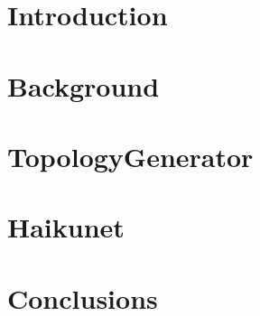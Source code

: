 \documentclass[11pt,a4paper,twoside]{tesis}
\begin{document}
\def\titulo{Licenciado }

\def\autor{Andrés Laurito}
\def\tituloTesis{Haikunet: \mbox{SDN programming language}}
\def\runtitulo{Haikunet: a SDN programming language for debugging the network}
\def\runtitle{Haikunet: SDN programming language}
\def\director{Hernán Melgratti}
\def\codirector{Rodrigo Castro}
\def\lugar{Buenos Aires, 2017}


\frontmatter
\pagestyle{empty}


\cleardoublepage


\cleardoublepage


\cleardoublepage


\cleardoublepage

\renewcommand*\contentsname{Summary}

\tableofcontents

\mainmatter
\pagestyle{headings}


\chapter{Introduction}


\chapter{Background}


\chapter{TopologyGenerator}


\chapter{Haikunet}


\chapter{Conclusions}


\backmatter
%
\end{document}
